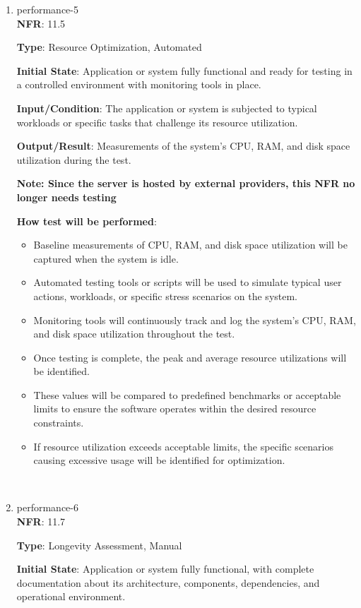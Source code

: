 \documentclass[12pt, titlepage]{article}
\begin{document}
\begin{enumerate}
\item{performance-5 \\}
\textbf{NFR}: 11.5

\textbf{Type}: Resource Optimization, Automated

\textbf{Initial State}: Application or system fully functional and ready for testing in a controlled environment with monitoring tools in place.

\textbf{Input/Condition}: The application or system is subjected to typical workloads or specific tasks that challenge its resource utilization.

\textbf{Output/Result}: Measurements of the system's CPU, RAM, and disk space utilization during the test.

\textbf{Note: Since the server is hosted by external providers, this NFR no longer needs testing  }

\textbf{How test will be performed}: 
\begin{itemize}
    \item Baseline measurements of CPU, RAM, and disk space utilization will be captured when the system is idle.
    \item Automated testing tools or scripts will be used to simulate typical user actions, workloads, or specific stress scenarios on the system.
    \item Monitoring tools will continuously track and log the system's CPU, RAM, and disk space utilization throughout the test.
    \item Once testing is complete, the peak and average resource utilizations will be identified.
    \item These values will be compared to predefined benchmarks or acceptable limits to ensure the software operates within the desired resource constraints.
    \item If resource utilization exceeds acceptable limits, the specific scenarios causing excessive usage will be identified for optimization.
\end{itemize}\\

\item{performance-6 \\}
\textbf{NFR}: 11.7

\textbf{Type}: Longevity Assessment, Manual

\textbf{Initial State}: Application or system fully functional, with complete documentation about its architecture, components, dependencies, and operational environment.


\end{enumerate}
\end{document}
